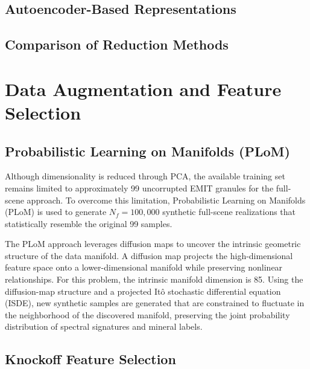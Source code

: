 \documentclass[11pt]{report}
\begin{document}
\section{Autoencoder-Based Representations}


\section{Comparison of Reduction Methods}



\chapter{Data Augmentation and Feature Selection}
\label{chap:augmentation}

\section{Probabilistic Learning on Manifolds (PLoM)}

Although dimensionality is reduced through PCA, the available training set remains limited to approximately 99 uncorrupted EMIT granules for the full-scene approach. To overcome this limitation, Probabilistic Learning on Manifolds (PLoM) \cite{ghanem2018} is used to generate $N_f = 100{,}000$ synthetic full-scene realizations that statistically resemble the original 99 samples.

The PLoM approach leverages diffusion maps to uncover the intrinsic geometric structure of the data manifold. A diffusion map projects the high-dimensional feature space onto a lower-dimensional manifold while preserving nonlinear relationships. For this problem, the intrinsic manifold dimension is 85. Using the diffusion-map structure and a projected It\^{o} stochastic differential equation (ISDE), new synthetic samples are generated that are constrained to fluctuate in the neighborhood of the discovered manifold, preserving the joint probability distribution of spectral signatures and mineral labels.

\section{Knockoff Feature Selection}
\end{document}
